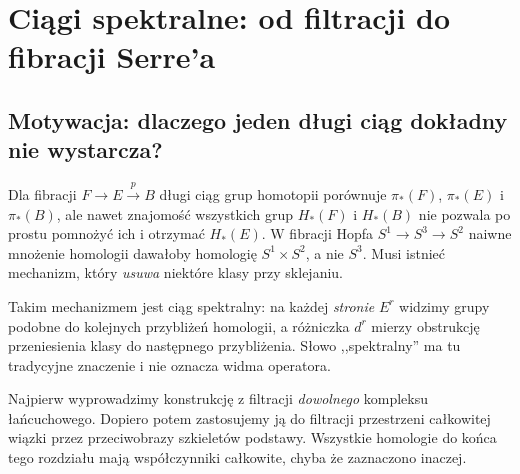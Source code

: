 \chapter{Ciągi spektralne: od filtracji do fibracji Serre'a}
\label{ch:ciagi-spektralne-v5}

\section{Motywacja: dlaczego jeden długi ciąg dokładny nie wystarcza?}
Dla fibracji $F\to E\xrightarrow{p}B$ długi ciąg grup homotopii
porównuje $\pi_*(F)$, $\pi_*(E)$ i $\pi_*(B)$, ale nawet
znajomość wszystkich grup $H_*(F)$ i $H_*(B)$ nie pozwala po prostu
pomnożyć ich i otrzymać $H_*(E)$. W fibracji Hopfa
$S^1\to S^3\to S^2$ naiwne mnożenie homologii dawałoby
homologię $S^1\times S^2$, a nie $S^3$. Musi istnieć
mechanizm, który \emph{usuwa} niektóre klasy przy sklejaniu.

Takim mechanizmem jest ciąg spektralny: na każdej \emph{stronie}
$E^r$ widzimy grupy podobne do kolejnych przybliżeń homologii,
a różniczka $d^r$ mierzy obstrukcję przeniesienia klasy do
następnego przybliżenia. Słowo ,,spektralny'' ma tu tradycyjne
znaczenie i nie oznacza widma operatora.

Najpierw wyprowadzimy konstrukcję z filtracji \emph{dowolnego}
kompleksu łańcuchowego. Dopiero potem zastosujemy ją do
filtracji przestrzeni całkowitej wiązki przez przeciwobrazy
szkieletów podstawy. Wszystkie homologie do końca tego rozdziału
mają współczynniki całkowite, chyba że zaznaczono inaczej.

